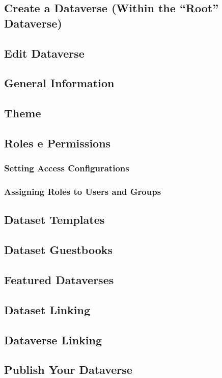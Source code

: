 \documentclass[12pt,hidelinks]{article}
\begin{document}
    \subsection{Create a Dataverse (Within the “Root” Dataverse)}
    \subsection{Edit Dataverse}
    \subsection{General Information}
    \subsection{Theme}
    \subsection{Roles e Permissions}
        \subsubsection{Setting Access Configurations}
        \subsubsection{Assigning Roles to Users and Groups}
    \subsection{Dataset Templates}
    \subsection{Dataset Guestbooks}
    \subsection{Featured Dataverses}
    \subsection{Dataset Linking}
    \subsection{Dataverse Linking}
    \subsection{Publish Your Dataverse}
\end{document}

